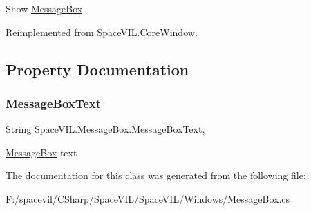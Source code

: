 Show \mbox{\hyperlink{class_space_v_i_l_1_1_message_box}{Message\+Box}} 



Reimplemented from \mbox{\hyperlink{class_space_v_i_l_1_1_core_window_a6f25e26e98c54d56d93b0abfc88af3c0}{Space\+V\+I\+L.\+Core\+Window}}.



\subsection{Property Documentation}
\mbox{\label{class_space_v_i_l_1_1_message_box_a17b1d957b5a8835a4dc60b0e59067ab0}} 
\subsubsection{\texorpdfstring{Message\+Box\+Text}{MessageBoxText}}
{\footnotesize\ttfamily String Space\+V\+I\+L.\+Message\+Box.\+Message\+Box\+Text\hspace{0.3cm}{\ttfamily [get]}, {\ttfamily [set]}}



\mbox{\hyperlink{class_space_v_i_l_1_1_message_box}{Message\+Box}} text 



The documentation for this class was generated from the following file\+:\begin{DoxyCompactItemize}
\item 
F\+:/spacevil/\+C\+Sharp/\+Space\+V\+I\+L/\+Space\+V\+I\+L/\+Windows/Message\+Box.\+cs\end{DoxyCompactItemize}
